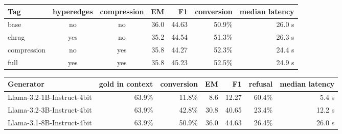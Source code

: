 \begin{tabular}{lccrrrr}
\toprule
Tag & hyperedges & compression & EM & F1 & conversion & median latency \\
\midrule
base & no & no & 36.0 & 44.63 & 50.9\% & 26.0 s \\
ehrag & yes & no & 35.2 & 44.54 & 51.3\% & 26.3 s \\
compression & no & yes & 35.8 & 44.27 & 52.3\% & 24.4 s \\
full & yes & yes & 35.8 & 45.23 & 52.5\% & 24.9 s \\
\bottomrule
\end{tabular}


\begin{tabular}{lrrrrrr}
\toprule
Generator & gold in context & conversion & EM & F1 & refusal & median latency \\
\midrule
Llama-3.2-1B-Instruct-4bit & 63.9\% & 11.8\% & 8.6 & 12.27 & 60.4\% & 5.4 s \\
Llama-3.2-3B-Instruct-4bit & 63.9\% & 42.8\% & 30.8 & 40.65 & 23.4\% & 12.2 s \\
Llama-3.1-8B-Instruct-4bit & 63.9\% & 50.9\% & 36.0 & 44.63 & 26.4\% & 26.0 s \\
\bottomrule
\end{tabular}